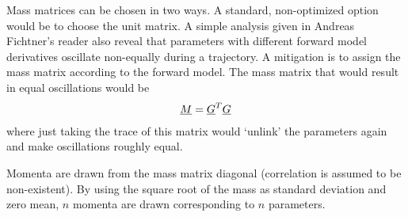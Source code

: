 Mass matrices can be chosen in two ways. A standard, non-optimized option would be to choose the unit matrix. A simple analysis given in Andreas Fichtner's reader also reveal that parameters with different forward model derivatives oscillate non-equally during a trajectory. A mitigation is to assign the mass matrix according to the forward model. The mass matrix that would result in equal oscillations would be 
\begin{gather}\label{eq:massMatrixForward}
\underline{M} = \underline{G}^T \underline{G}
\end{gather}
where just taking the trace of this matrix would `unlink' the parameters again and make oscillations roughly equal.

 Momenta are drawn from the mass matrix diagonal (correlation is assumed to be non-existent). By using the square root of the mass as standard deviation and zero mean, $n$ momenta are drawn corresponding to $n$ parameters.

